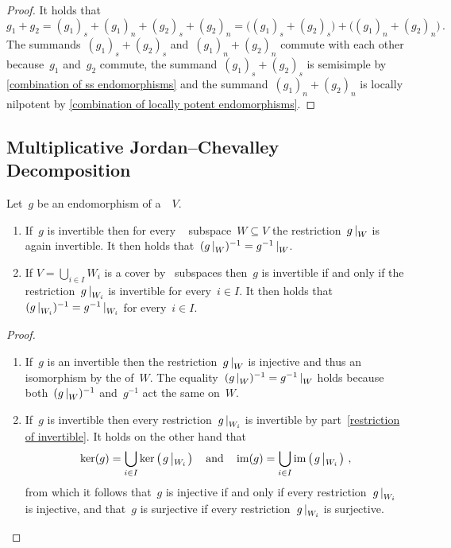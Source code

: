 \begin{proof}
  It holds that
  \[
      g_1 + g_2
    = (g_1)_s + (g_1)_n + (g_2)_s + (g_2)_n
    = \bigl( (g_1)_s + (g_2)_s \bigr) + \bigl( (g_1)_n + (g_2)_n \bigr) \,.
  \]
  The summands~$(g_1)_s + (g_2)_s$ and~$(g_1)_n + (g_2)_n$ commute with each other because~$g_1$ and~$g_2$ commute, the summand~$(g_1)_s + (g_2)_s$ is semisimple by \cref{combination of ss endomorphisms} and the summand~$(g_1)_n + (g_2)_n$ is locally nilpotent by \cref{combination of locally potent endomorphisms}.
\end{proof}





\subsection{Multiplicative Jordan--Chevalley Decomposition}


\begin{lemma}
  \label{invertibility via fd}
  Let~$g$ be an endomorphism of a~~$V$.
  \begin{enumerate}
    \item
      \label{restriction of invertible}
      If~$g$ is invertible then for every ~ subspace~$W \subseteq V$ the restriction~$\restrict{g}{W}$ is again invertible.
      It then holds that~$(\restrict{g}{W})^{-1} = \restrict{g^{-1}}{W}$.
    \item
      If $V = \bigcup_{i \in I} W_i$ is a cover by~ subspaces then~$g$ is invertible if and only if the restriction~$\restrict{g}{W_i}$ is invertible for every~$i \in I$.
      It then holds that~$( \restrict{g}{W_i} )^{-1} = \restrict{g^{-1}}{W_i}$ for every~$i \in I$.
  \end{enumerate}
\end{lemma}


\begin{proof}
  \leavevmode
  \begin{enumerate}
    \item
      If~$g$ is an invertible then the restriction~$\restrict{g}{W}$ is injective and thus an isomorphism by the  of~$W$.
      The equality~$(\restrict{g}{W})^{-1} = \restrict{g^{-1}}{W}$ holds because both~$(\restrict{g}{W})^{-1}$ and~$g^{-1}$ act the same on~$W$.
    \item
      If~$g$ is invertible then every restriction~$\restrict{g}{W_i}$ is invertible by part~\ref*{restriction of invertible}.
      It holds on the other hand that
      \[
          \ker(g)
        = \bigcup_{i \in I} \ker\left( \restrict*{g}{W_i} \right)
        \quad\text{and}\quad
          \im(g)
        = \bigcup_{i \in I} \im\left( \restrict*{g}{W_i} \right) \,,
      \]
      from which it follows that~$g$ is injective if and only if every restriction~$\restrict{g}{W_i}$ is injective, and that~$g$ is surjective if every restriction~$\restrict{g}{W_i}$ is surjective.
    \qedhere
  \end{enumerate}
\end{proof}



